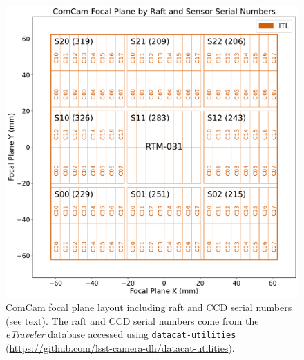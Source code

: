 \documentclass[CTN,authoryear,toc]{lsstdoc}
\begin{document}
\begin{figure}
  \centering
  \includegraphics[width=\textwidth]{figures/ComCam_focal_plane_CTN_001_FIG2.pdf}
	\caption{ComCam focal plane layout including raft and CCD serial numbers (see text). The raft and CCD serial numbers come from the \emph{eTraveler} database accessed using {\tt{datacat-utilities}} (\url{https://github.com/lsst-camera-dh/datacat-utilities}).}
  \label{fig:comcam_focal_plane_2}
\end{figure}

\clearpage
\end{document}
